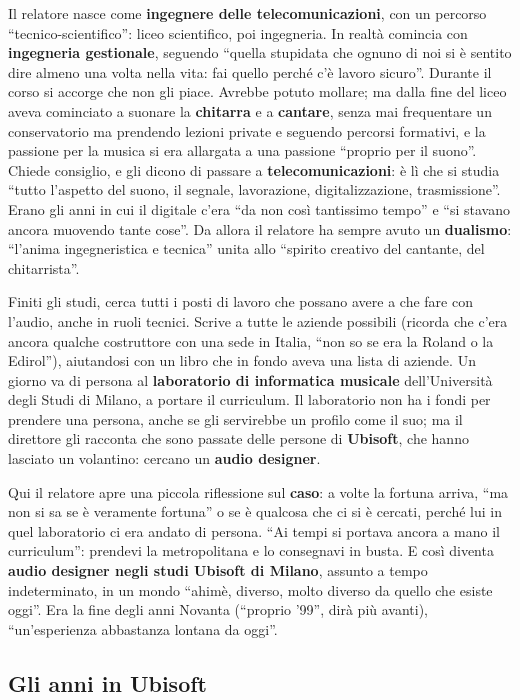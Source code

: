 Il relatore nasce come \textbf{ingegnere delle telecomunicazioni}, con un
percorso ``tecnico-scientifico'': liceo scientifico, poi ingegneria. In realtà
comincia con \textbf{ingegneria gestionale}, seguendo ``quella stupidata che
ognuno di noi si è sentito dire almeno una volta nella vita: fai quello perché
c'è lavoro sicuro''. Durante il corso si accorge che non gli piace. Avrebbe
potuto mollare; ma dalla fine del liceo aveva cominciato a suonare la
\textbf{chitarra} e a \textbf{cantare}, senza mai frequentare un conservatorio
ma prendendo lezioni private e seguendo percorsi formativi, e la passione per la
musica si era allargata a una passione ``proprio per il suono''. Chiede
consiglio, e gli dicono di passare a \textbf{telecomunicazioni}: è lì che si
studia ``tutto l'aspetto del suono, il segnale, lavorazione, digitalizzazione,
trasmissione''. Erano gli anni in cui il digitale c'era ``da non così tantissimo
tempo'' e ``si stavano ancora muovendo tante cose''. Da allora il relatore ha
sempre avuto un \textbf{dualismo}: ``l'anima ingegneristica e tecnica'' unita
allo ``spirito creativo del cantante, del chitarrista''.

Finiti gli studi, cerca tutti i posti di lavoro che possano avere a che fare con
l'audio, anche in ruoli tecnici. Scrive a tutte le aziende possibili (ricorda
che c'era ancora qualche costruttore con una sede in Italia, ``non so se era la
Roland o la Edirol''), aiutandosi con un libro che in fondo aveva una lista di
aziende. Un giorno va di persona al \textbf{laboratorio di informatica musicale}
dell'Università degli Studi di Milano, a portare il curriculum. Il laboratorio
non ha i fondi per prendere una persona, anche se gli servirebbe un profilo come
il suo; ma il direttore gli racconta che sono passate delle persone di
\textbf{Ubisoft}, che hanno lasciato un volantino: cercano un \textbf{audio
designer}.

Qui il relatore apre una piccola riflessione sul \textbf{caso}: a volte la
fortuna arriva, ``ma non si sa se è veramente fortuna'' o se è qualcosa che ci
si è cercati, perché lui in quel laboratorio ci era andato di persona. ``Ai
tempi si portava ancora a mano il curriculum'': prendevi la metropolitana e lo
consegnavi in busta. E così diventa \textbf{audio designer negli studi Ubisoft di
Milano}, assunto a tempo indeterminato, in un mondo ``ahimè, diverso, molto
diverso da quello che esiste oggi''. Era la fine degli anni Novanta (``proprio
'99'', dirà più avanti), ``un'esperienza abbastanza lontana da oggi''.

\subsection{Gli anni in Ubisoft}

